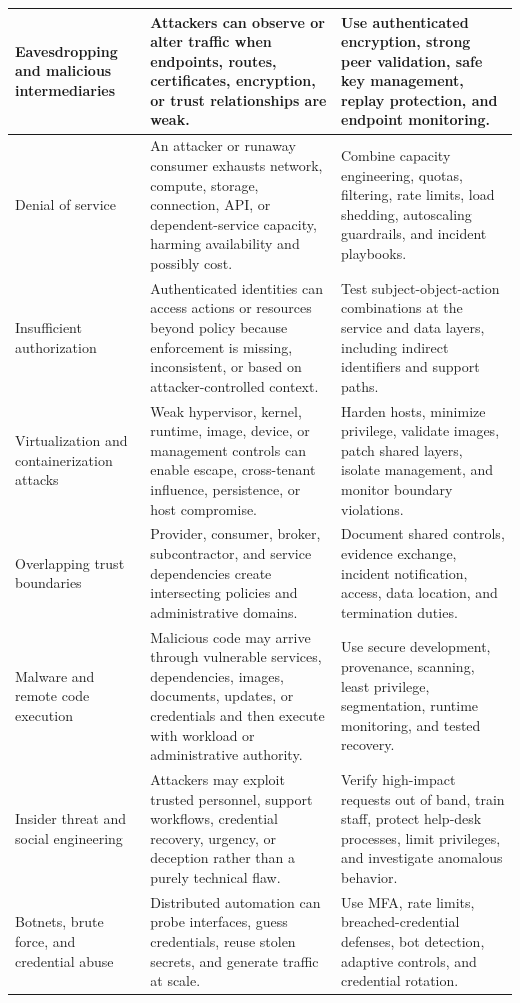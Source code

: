 \documentclass[11pt]{article}
\begin{document}
\begin{longtable}{@{}>{\RaggedRight\arraybackslash}p{}>{\RaggedRight\arraybackslash}p{}>{\RaggedRight\arraybackslash}p{}@{}}
Eavesdropping and malicious intermediaries & Attackers can observe or alter traffic when endpoints, routes, certificates, encryption, or trust relationships are weak. & Use authenticated encryption, strong peer validation, safe key management, replay protection, and endpoint monitoring. \\\midrule
Denial of service & An attacker or runaway consumer exhausts network, compute, storage, connection, API, or dependent-service capacity, harming availability and possibly cost. & Combine capacity engineering, quotas, filtering, rate limits, load shedding, autoscaling guardrails, and incident playbooks. \\\midrule
Insufficient authorization & Authenticated identities can access actions or resources beyond policy because enforcement is missing, inconsistent, or based on attacker-controlled context. & Test subject-object-action combinations at the service and data layers, including indirect identifiers and support paths. \\\midrule
Virtualization and containerization attacks & Weak hypervisor, kernel, runtime, image, device, or management controls can enable escape, cross-tenant influence, persistence, or host compromise. & Harden hosts, minimize privilege, validate images, patch shared layers, isolate management, and monitor boundary violations. \\\midrule
Overlapping trust boundaries & Provider, consumer, broker, subcontractor, and service dependencies create intersecting policies and administrative domains. & Document shared controls, evidence exchange, incident notification, access, data location, and termination duties. \\\midrule
Malware and remote code execution & Malicious code may arrive through vulnerable services, dependencies, images, documents, updates, or credentials and then execute with workload or administrative authority. & Use secure development, provenance, scanning, least privilege, segmentation, runtime monitoring, and tested recovery. \\\midrule
Insider threat and social engineering & Attackers may exploit trusted personnel, support workflows, credential recovery, urgency, or deception rather than a purely technical flaw. & Verify high-impact requests out of band, train staff, protect help-desk processes, limit privileges, and investigate anomalous behavior. \\\midrule
Botnets, brute force, and credential abuse & Distributed automation can probe interfaces, guess credentials, reuse stolen secrets, and generate traffic at scale. & Use MFA, rate limits, breached-credential defenses, bot detection, adaptive controls, and credential rotation. \\\midrule

\end{longtable}
\end{document}
